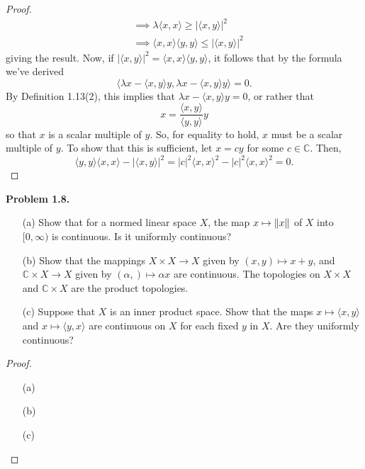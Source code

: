 \documentclass[12pt]{article}
\theoremstyle{definition}
\begin{document}
\begin{proof}
\begin{align*}
				&\implies \lambda \langle x, x \rangle \geq |\langle x, y \rangle|^2 \\
				&\implies \langle x, x \rangle \langle y, y \rangle \leq |\langle x, y \rangle|^2
			\end{align*}
		giving the result. Now, if $|\langle x, y \rangle|^2 = \langle x, x \rangle \langle y, y \rangle$, it follows that by the formula we've derived $$\langle \lambda x - \langle x, y \rangle y, \lambda x - \langle x, y \rangle y \rangle = 0.$$ By Definition 1.13(2), this implies that $\lambda x - \langle x, y \rangle y = 0$, or rather that $$x = \frac{\langle x, y \rangle}{\langle y, y\rangle} y$$ so that $x$ is a scalar multiple of $y$. So, for equality to hold, $x$ must be a scalar multiple of $y$. To show that this is sufficient, let $x = cy$ for some $c \in \mathbb{C}$. Then, $$\langle y, y \rangle \langle x, x \rangle - |\langle x, y \rangle|^2 = |c|^2 \langle x, x\rangle^2 - |c|^2 \langle x, x \rangle^2 = 0.$$ 
	\end{proof}


\noindent \textbf{Problem 1.8.} ~
	\begin{itemize}
		\item[(a)] Show that for a normed linear space $X$, the map $x \mapsto \norm{x}$ of $X$ into $[0, \infty)$ is continuous. Is it uniformly continuous?
		
		\item[(b)] Show that the mappings $X \times X \to X$ given by $(x, y) \mapsto x + y$, and $\mathbb{C} \times X \to X$ given by $(\alpha, ) \mapsto \alpha x$ are continuous. The topologies on $X \times X$ and $\mathbb{C} \times X$ are the product topologies.  
		
		\item[(c)] Suppose that $X$ is an inner product space. Show that the maps $x \mapsto \langle x, y\rangle$ and $x \mapsto \langle y, x\rangle$ are continuous on $X$ for each fixed $y$ in $X$. Are they uniformly continuous? 
	\end{itemize}
	\begin{proof} ~
		\begin{itemize}
			\item[(a)]
			
			\item[(b)]
			
			\item[(c)] 
		\end{itemize}
	\end{proof}
\end{document}
